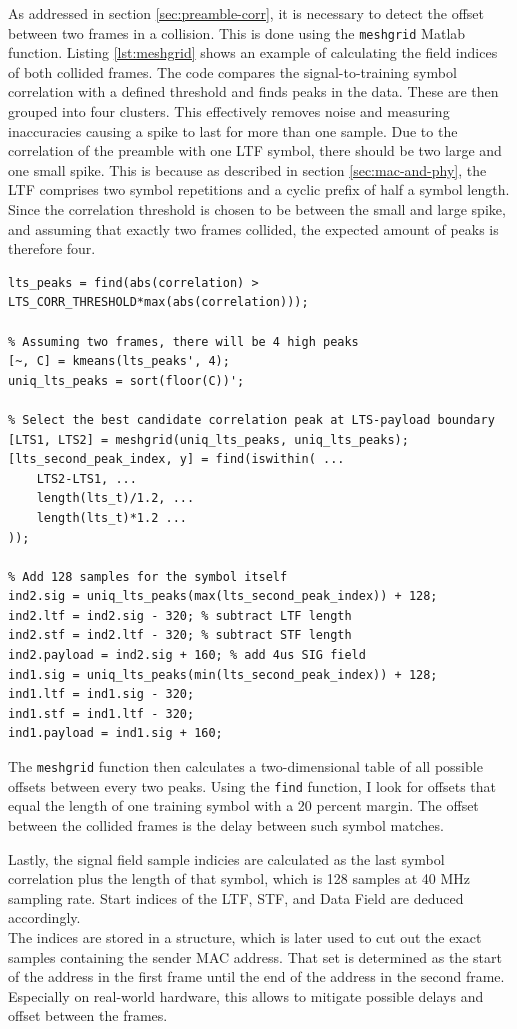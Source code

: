 As addressed in section \ref{sec:preamble-corr}, it is necessary to detect the offset between two frames in a collision. This is done using the \texttt{meshgrid} Matlab function. Listing \ref{lst:meshgrid} shows an example of calculating the field indices of both collided frames. The code compares the signal-to-training symbol correlation with a defined threshold and finds peaks in the data. These are then grouped into four clusters. This effectively removes noise and measuring inaccuracies causing a spike to last for more than one sample. Due to the correlation of the preamble with one \gls{LTF} symbol, there should be two large and one small spike. This is because as described in section \ref{sec:mac-and-phy}, the \gls{LTF} comprises two symbol repetitions and a cyclic prefix of half a symbol length. Since the correlation threshold is chosen to be between the small and large spike, and assuming that exactly two frames collided, the expected amount of peaks is therefore four.

\begin{lstlisting}[captionpos=b,caption={Collision Offset Detection using Meshgrid},label=lst:meshgrid]
% Find peaks above a parametrized threshold
lts_peaks = find(abs(correlation) > LTS_CORR_THRESHOLD*max(abs(correlation)));

% Assuming two frames, there will be 4 high peaks
[~, C] = kmeans(lts_peaks', 4);
uniq_lts_peaks = sort(floor(C))';

% Select the best candidate correlation peak at LTS-payload boundary
[LTS1, LTS2] = meshgrid(uniq_lts_peaks, uniq_lts_peaks);
[lts_second_peak_index, y] = find(iswithin( ...
    LTS2-LTS1, ...
    length(lts_t)/1.2, ...
    length(lts_t)*1.2 ...
));

% Add 128 samples for the symbol itself
ind2.sig = uniq_lts_peaks(max(lts_second_peak_index)) + 128;
ind2.ltf = ind2.sig - 320; % subtract LTF length
ind2.stf = ind2.ltf - 320; % subtract STF length
ind2.payload = ind2.sig + 160; % add 4us SIG field
ind1.sig = uniq_lts_peaks(min(lts_second_peak_index)) + 128;
ind1.ltf = ind1.sig - 320;
ind1.stf = ind1.ltf - 320;
ind1.payload = ind1.sig + 160;
\end{lstlisting}

The \texttt{meshgrid} function then calculates a two-dimensional table of all possible offsets between every two peaks. Using the \texttt{find} function, I look for offsets that equal the length of one training symbol with a 20 percent margin.  The offset between the collided frames is the delay between such symbol matches.

Lastly, the signal field sample indicies are calculated as the last symbol correlation plus the length of that symbol, which is 128 samples at 40 MHz sampling rate. Start indices of the \gls{LTF}, \gls{STF}, and Data Field are deduced accordingly.\\

The indices are stored in a structure, which is later used to cut out the exact samples containing the sender MAC address. That set is determined as the start of the address in the first frame until the end of the address in the second frame. Especially on real-world hardware, this allows to mitigate possible delays and offset between the frames.
